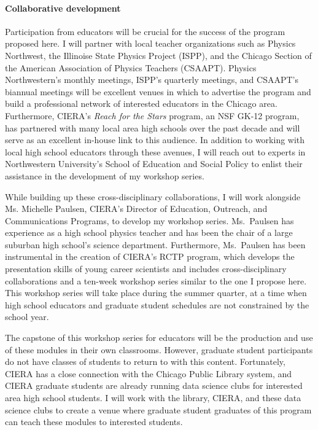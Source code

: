\documentclass[11pt, preprint]{aastex}
\begin{document}
\vspace{-0.5cm}
\paragraph{Collaborative development}
\label{sct:development}
Participation from educators will be crucial for the success of the program proposed here.
I will partner with local teacher organizations such as Physics Northwest, the Illinoise State Physics Project (ISPP), and the Chicago Section of the American Association of Physics Teachers (CSAAPT).
Physics Northwestern's monthly meetings, ISPP's quarterly meetings, and CSAAPT's biannual meetings will be excellent venues in which to advertise the program and build a professional network of interested educators in the Chicago area.
Furthermore, CIERA's \emph{Reach for the Stars} program, an NSF GK-12 program, has partnered with many local area high schools over the past decade and will serve as an excellent in-house link to this audience.
In addition to working with local high school educators through these avenues, I will reach out to experts in Northwestern University's School of Education and Social Policy to enlist their assistance in the development of my workshop series.

While building up these cross-disciplinary collaborations, I will work alongside Ms. Michelle Paulsen, CIERA's Director of Education, Outreach, and Communications Programs, to develop my workshop series.
Ms.~Paulsen has experience as a high school physics teacher and has been the chair of a large suburban high school's science department.
Furthermore, Ms.~Paulsen has been instrumental in the creation of CIERA's RCTP program, which develops the presentation skills of young career scientists and includes cross-disciplinary collaborations and a ten-week workshop series similar to the one I propose here.
This workshop series will take place during the summer quarter, at a time when high school educators and graduate student schedules are not constrained by the school year.

The capstone of this workshop series for educators will be the production and use of these modules in their own classrooms.
However, graduate student participants do not have classes of students to return to with this content.
Fortunately, CIERA has a close connection with the Chicago Public Library system, and CIERA graduate students are already running data science clubs for interested area high school students.
I will work with the library, CIERA, and these data science clubs to create a venue where graduate student graduates of this program can teach these modules to interested students.
\end{document}
